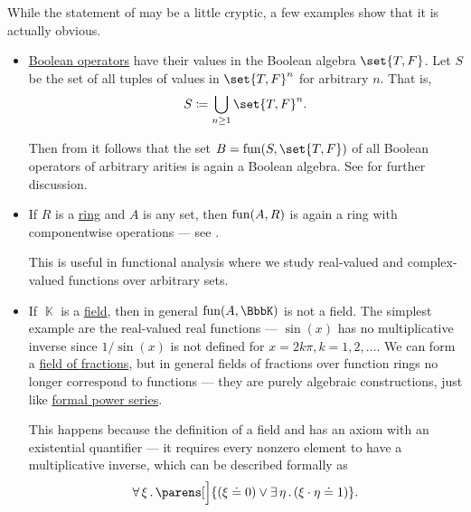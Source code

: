 \begin{example}\label{ex:thm:functions_over_model_of_positive_formulas_form_model}
  While the statement of  may be a little cryptic, a few examples show that it is actually obvious.
  \begin{itemize}
    \item \hyperref[def:boolean_operator]{Boolean operators} have their values in the Boolean algebra \( \set{ T, F } \). Let \( S \) be the set of all tuples of values in \( \set{ T, F }^n \) for arbitrary \( n \). That is,
    \begin{equation*}
      S \coloneqq \bigcup_{n \geq 1} \set{ T, F }^n.
    \end{equation*}

    Then from  it follows that the set \( B = \fun(S, \set{ T, F }) \) of all Boolean operators of arbitrary arities is again a Boolean algebra. See  for further discussion.

    \item If \( R \) is a \hyperref[def:ring]{ring} and \( A \) is any set, then \( \operatorname{fun}(A, R) \) is again a ring with componentwise operations --- see .

    This is useful in functional analysis where we study real-valued and complex-valued functions over arbitrary sets.

    \item If \( \BbbK \) is a \hyperref[def:field]{field}, then in general \( \fun(A, \BbbK) \) is not a field. The simplest example are the real-valued real functions --- \( \sin(x) \) has no multiplicative inverse since \( 1 / \sin(x) \) is not defined for \( x = 2k\pi, k = 1, 2, \ldots \). We can form a \hyperref[thm:field_of_fractions]{field of fractions}, but in general fields of fractions over function rings no longer correspond to functions --- they are purely algebraic constructions, just like \hyperref[def:formal_power_series]{formal power series}.

    This happens because the definition of a field and has an axiom with an existential quantifier --- it requires every nonzero element to have a multiplicative inverse, which can be described formally as
    \begin{equation*}
      \qforall \xi \parens[\Big]{ (\xi \doteq 0) \vee \qexists \eta (\xi \cdot \eta \doteq 1) }.
    \end{equation*}
  \end{itemize}
\end{example}

